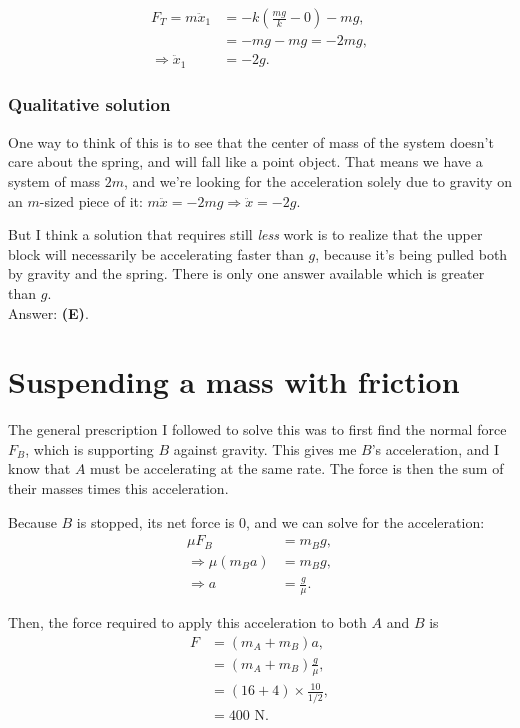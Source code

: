 \documentclass[11pt]{paper}
\newcommand{\answer}[1]{Answer: \textbf{(#1)}.}
\begin{document}
\begin{align}
F_T =m\ddot{x}_1&= -k(\frac{mg}{k}-0) -mg,\\
&= -mg-mg= -2mg,\\
\Rightarrow\ddot{x}_1 &= -2g.
\end{align}

\subsubsection*{Qualitative solution}
One way to think of this is to see that the center of mass of the system doesn't care about the spring, and will fall like a point object.  That means we have a system of mass $2m$, and we're looking for the acceleration solely due to gravity on an $m$-sized piece of it: $m\ddot{x} = -2mg \Rightarrow \ddot{x} = -2g$.

But I think a solution that requires still \emph{less} work is to realize that the upper block will necessarily be accelerating faster than $g$, because it's being pulled both by gravity and the spring.  There is only one answer available which is greater than $g$.\\

\answer{E}

\section{Suspending a mass with friction}
The general prescription I followed to solve this was to first find the normal force $F_B$, which is supporting $B$ against gravity.  This gives me $B$'s acceleration, and I know that $A$ must be accelerating at the same rate.  The force is then the sum of their masses times this acceleration.

Because $B$ is stopped, its net force is 0, and we can solve for the acceleration:
\begin{align}
\mu F_B &= m_Bg,\\
\Rightarrow \mu (m_B a) &= m_Bg,\\
\Rightarrow a &= \frac{g}{\mu}.
\end{align}

Then, the force required to apply this acceleration to both $A$ and $B$ is
\begin{align}
F &= (m_A + m_B)a,\\
&= (m_A + m_B)\frac{g}{\mu},\\
&= (16 + 4)\times\frac{10}{1/2},\\
&=400\text{ N}.
\end{align}
\end{document}
